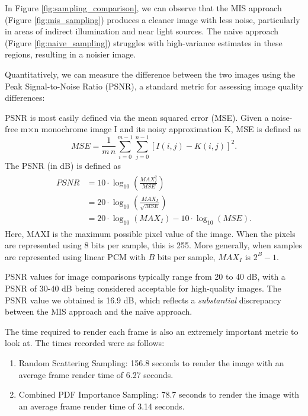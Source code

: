 \documentclass[12pt]{article}
\begin{document}
In Figure \ref{fig:sampling_comparison}, we can observe that the MIS approach (Figure \ref{fig:mis_sampling}) produces a cleaner image with less noise, particularly in areas of indirect illumination and near light sources. The naive approach (Figure \ref{fig:naive_sampling}) struggles with high-variance estimates in these regions, resulting in a noisier image.

Quantitatively, we can measure the difference between the two images using the Peak Signal-to-Noise Ratio (PSNR), a standard metric for assessing image quality differences:

PSNR is most easily defined via the mean squared error (MSE). Given a noise-free m×n monochrome image I and its noisy approximation K, MSE is defined as
\[
    {\displaystyle {\mathit {MSE}}={\frac {1}{m\,n}}\sum _{i=0}^{m-1}\sum _{j=0}^{n-1}[I(i,j)-K(i,j)]^{2}.}
\]
The PSNR (in dB) is defined as
\[
    \begin{array}{c} {\displaystyle {\begin{aligned}{\mathit {PSNR}}&=10\cdot \log _{10}\left({\frac {{\mathit {MAX}}_{I}^{2}}{\mathit {MSE}}}\right)\\&=20\cdot \log _{10}\left({\frac {{\mathit {MAX}}_{I}}{\sqrt {\mathit {MSE}}}}\right)\\&=20\cdot \log _{10}({\mathit {MAX}}_{I})-10\cdot \log _{10}({\mathit {MSE}}).\end{aligned}}} \end{array}
\]
Here, MAXI is the maximum possible pixel value of the image. When the pixels are represented using 8 bits per sample, this is 255. More generally, when samples are represented using linear PCM with $B$ bits per sample, $MAX_I$ is $2^B - 1$.

PSNR values for image comparisons typically range from 20 to 40 dB, with a PSNR of 30-40 dB being considered acceptable for high-quality images. The PSNR value we obtained is 16.9 dB, which reflects a \textit{substantial} discrepancy between the MIS approach and the naive approach.

The time required to render each frame is also an extremely important metric to look at. The times recorded were as follows:
\begin{enumerate}
    \item Random Scattering Sampling:
          156.8 seconds to render the image with an average frame render time of 6.27 seconds.

    \item Combined PDF Importance Sampling:
          78.7 seconds to render the image with an average frame render time of 3.14 seconds.
\end{enumerate}
\end{document}
